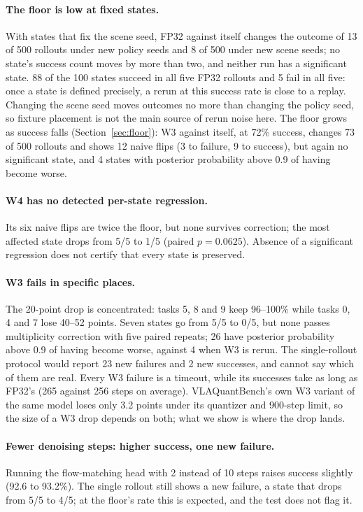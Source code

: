\documentclass{article}
\begin{document}
\paragraph{The floor is low at fixed states.} With states that fix the scene seed, FP32 against
itself changes the outcome of 13 of 500 rollouts under new policy seeds and 8 of 500 under new
scene seeds; no state's success count moves by more than two, and neither run has a significant
state. 88 of the 100 states succeed in all five FP32 rollouts and 5 fail in all five: once a
state is defined precisely, a rerun at this success rate is close to a replay. Changing the scene
seed moves outcomes no more than changing the policy seed, so fixture placement is not the main
source of rerun noise here. The floor grows as success falls (Section~\ref{sec:floor}): W3
against itself, at 72\% success, changes 73 of 500 rollouts and shows 12 naive flips (3 to
failure, 9 to success), but again no significant state, and 4 states with posterior probability
above 0.9 of having become worse.

\paragraph{W4 has no detected per-state regression.} Its six naive flips are twice the floor,
but none survives correction; the most affected state drops from 5/5 to 1/5 (paired $p=0.0625$).
Absence of a significant regression does not certify that every state is preserved.

\paragraph{W3 fails in specific places.} The 20-point drop is concentrated: tasks 5, 8 and 9 keep
96--100\% while tasks 0, 4 and 7 lose 40--52 points. Seven states go from 5/5 to 0/5, but none
passes multiplicity correction with five paired repeats; 26 have posterior probability above
0.9 of having become worse, against 4 when W3 is
rerun. The single-rollout protocol would report 23 new failures and 2 new successes, and cannot
say which of them are real.
Every W3 failure is a timeout, while its successes take as long as FP32's (265 against 256 steps
on average). VLAQuantBench's own W3 variant of the same model loses only 3.2 points under its
quantizer and 900-step limit, so the size of a W3 drop depends on both; what we show is where
the drop lands.

\paragraph{Fewer denoising steps: higher success, one new failure.} Running the
flow-matching head with 2 instead of 10 steps raises success slightly (92.6 to 93.2\%). The single
rollout still shows a new failure, a state that drops from 5/5 to 4/5; at the floor's rate this is
expected, and the test does not flag it.
\end{document}
